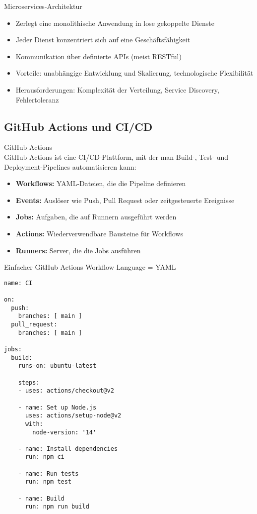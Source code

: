 \begin{concept}{Microservices-Architektur}\\
    \begin{itemize}
        \item Zerlegt eine monolithische Anwendung in lose gekoppelte Dienste
        \item Jeder Dienst konzentriert sich auf eine Geschäftsfähigkeit
        \item Kommunikation über definierte APIs (meist RESTful)
        \item Vorteile: unabhängige Entwicklung und Skalierung, technologische Flexibilität
        \item Herausforderungen: Komplexität der Verteilung, Service Discovery, Fehlertoleranz
    \end{itemize}
\end{concept}

\subsection{GitHub Actions und CI/CD}

\begin{concept}{GitHub Actions}\\
    GitHub Actions ist eine CI/CD-Plattform, mit der man Build-, Test- und Deployment-Pipelines automatisieren kann:
    \begin{itemize}
        \item \textbf{Workflows:} YAML-Dateien, die die Pipeline definieren
        \item \textbf{Events:} Auslöser wie Push, Pull Request oder zeitgesteuerte Ereignisse
        \item \textbf{Jobs:} Aufgaben, die auf Runnern ausgeführt werden
        \item \textbf{Actions:} Wiederverwendbare Bausteine für Workflows
        \item \textbf{Runners:} Server, die die Jobs ausführen
    \end{itemize}
\end{concept}

\begin{examplecode}{Einfacher GitHub Actions Workflow} Language = YAML\\
\begin{lstlisting}[style=basesmol]
name: CI

on:
  push:
    branches: [ main ]
  pull_request:
    branches: [ main ]

jobs:
  build:
    runs-on: ubuntu-latest
    
    steps:
    - uses: actions/checkout@v2
    
    - name: Set up Node.js
      uses: actions/setup-node@v2
      with:
        node-version: '14'
        
    - name: Install dependencies
      run: npm ci
      
    - name: Run tests
      run: npm test
      
    - name: Build
      run: npm run build
\end{lstlisting}
\end{examplecode}

